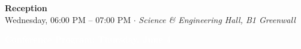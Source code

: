\documentclass[
  10pt,
  letterpaper,
  DIV=11,
  numbers=noendperiod]{scrartcl}
\begin{document}
\vspace{1em}


\begin{center}
\colorbox{event!15}{\parbox{0.9\linewidth}{\centering
  \textcolor{event}{\large\textbf{Reception}}\\[2pt]
  {\small Wednesday, 06:00 PM – 07:00 PM $\cdot$ \textit{Science \& Engineering Hall, B1 Greenwall}}
}}
\end{center}

\newpage

\markboth{}{}
\noindent\colorbox{event}{\parbox{\dimexpr\linewidth-2\fboxsep}{\centering\textcolor{white}{\large\textbf{Conference Program: Thursday, June 4}}}}

\vspace{0.6em}
\end{document}
